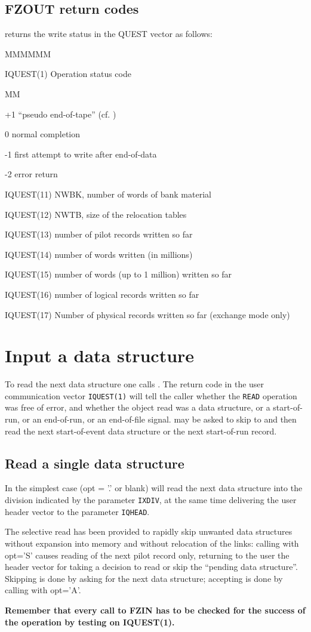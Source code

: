 \subsection{FZOUT return codes}
 returns the write status in the QUEST vector as follows:
\begin{DL}{MMMMMM}
\item[IQUEST(1)]Operation status code
\begin{DL}{MM}
\item[+1]``pseudo end-of-tape'' (cf. )
\item[ 0]normal completion
\item[-1]first attempt to write after end-of-data
\item[-2]error return
\end{DL}
\item[IQUEST(11)]NWBK, number of words of bank material
\item[IQUEST(12)]NWTB, size of the relocation tables
\item[IQUEST(13)]number of pilot records written so far
\item[IQUEST(14)]number of words written (in millions)
\item[IQUEST(15)]number of words (up to 1 million) written so far
\item[IQUEST(16)]number of logical records written so far
\item[IQUEST(17)]Number of physical records written so far (exchange mode only)
\end{DL}
\section{Input a data structure}
To read the next data structure one calls .
The return code in the user communication vector
{\tt IQUEST(1)} will tell the caller whether
the {\tt READ} operation was free of error, and whether the
object read was a data structure, or a start-of-run,
or an end-of-run,
or an end-of-file signal.
 may be asked to skip to and then read the next start-of-event
data structure or the next start-of-run record.
\subsection{Read a single data structure}
\par In the simplest case (opt = '.' or blank)  will read the next
data structure into the division indicated by the parameter {\tt IXDIV},
at the same time delivering the user header vector to the
parameter {\tt IQHEAD}.
\par The selective read has been provided to rapidly skip unwanted
data structures without expansion into memory and without relocation
of the links:
calling  with opt='S' causes reading of the next pilot record
only, returning to the user the header vector for taking a
decision to read or skip the ``pending data structure''.
Skipping is done by asking for the next data structure;
accepting is done by calling  with opt='A'.
\par {\bf Remember
that every call to FZIN has to be checked for the success of
the operation by testing on IQUEST(1).}
